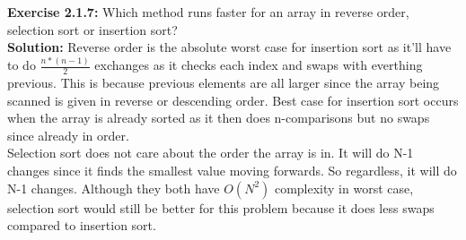 \documentclass[11pt,fleqn]{article}
\begin{document}
\textbf{Exercise 2.1.7:} Which method runs faster for an array in reverse order, selection sort or insertion
sort?\\

\textbf{Solution:}
Reverse order is the absolute worst case for insertion sort as it'll have to do $\frac{n*(n-1)}{2}$ exchanges as it checks each index and swaps with everthing previous. This is because previous elements are all larger since the array being scanned is given in reverse or descending order. Best case for insertion sort occurs when the array is already sorted as it then does n-comparisons but no swaps since already in order.\\

Selection sort does not care about the order the array is in. It will do N-1 changes since it finds the smallest value moving forwards. So regardless, it will do N-1 changes. Although they both have $O(N^2)$ complexity in worst case, selection sort would still be better for this problem because it does less swaps compared to insertion sort.
\end{document}
